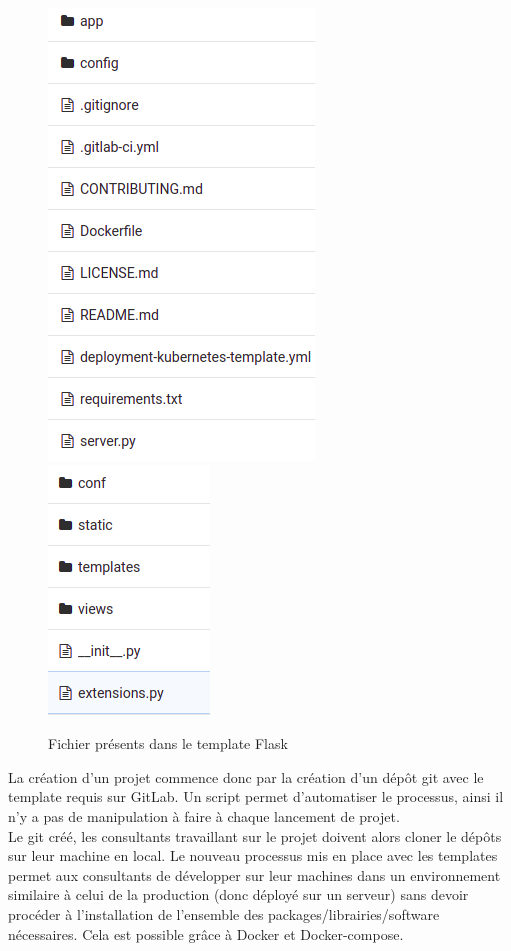 \documentclass{article} %
\begin{document}
\begin{figure}[!h]
	\centering
	\includegraphics[keepaspectratio = true,scale=0.6]{confflask.png}
	\hspace{2cm}
	\includegraphics[keepaspectratio = true,scale=0.6]{cfla.png}
	\caption{Fichier présents dans le template Flask}
	\label{fig:cfl}
\end{figure}

La création d'un projet commence donc par la création d'un dépôt git avec le template requis sur GitLab. Un script permet d'automatiser le processus, ainsi il n'y a pas de manipulation à faire à chaque lancement de projet.\\

Le git créé, les consultants travaillant sur le projet doivent alors cloner le dépôts sur leur machine en local. Le nouveau processus mis en place avec les templates permet aux consultants de développer sur leur machines dans un environnement similaire à celui de la production (donc déployé sur un serveur) sans devoir procéder à l'installation de l'ensemble des packages/librairies/software nécessaires. Cela est possible grâce à Docker et Docker-compose.\\
\end{document}
